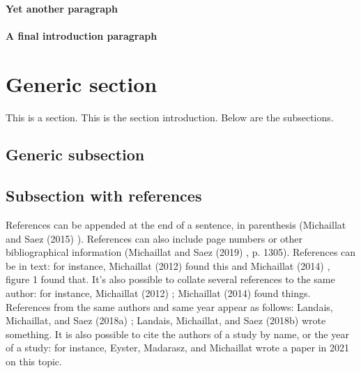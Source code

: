 \documentclass{article}
\begin{document}
\paragraph{Yet another paragraph} \wcTpLoremIpsum*[type=sentence,words-per-sentence=89,seed=108]{} 

\paragraph{A final introduction paragraph} \wcTpLoremIpsum*[type=sentence,words-per-sentence=134,seed=109]{} 

\section{Generic section}\label{s:section}

This is a section. This is the section introduction. Below are the subsections. \wcTpLoremIpsum*[type=sentence,words-per-sentence=31,seed=110]{}  

\subsection{Generic subsection}

 \wcTpLoremIpsum*[type=sentence,words-per-sentence=66,seed=111]{}  

 \wcTpLoremIpsum*[type=sentence,words-per-sentence=56,seed=112]{} \wcTpRef*[href=^note-4]{} 

 \wcTpLoremIpsum*[type=sentence,words-per-sentence=125,seed=113]{} 

\subsection{Subsection with references} 

References can be appended at the end of a sentence, in parenthesis (Michaillat and Saez (2015) \wcTpRef*[href=@MS15]{}). References can also include page numbers or other bibliographical information (Michaillat and Saez (2019) \wcTpRef*[href=@MS19]{}, p. 1305).  References can be in text: for instance, Michaillat (2012) \wcTpRef*[href=@M12]{} found this and Michaillat (2014) \wcTpRef*[href=@M14]{}, figure 1 found that. It's also possible to collate several references to the same author: for instance, Michaillat (2012) \wcTpRef*[href=@M12]{}; Michaillat (2014) \wcTpRef*[href=@M14]{} found things. References from the same authors and same year appear as follows: Landais, Michaillat, and Saez (2018a) \wcTpRef*[href=@LMS18a]{}; Landais, Michaillat, and Saez (2018b) \wcTpRef*[href=@LMS18b]{} wrote something. It is also possible to cite the authors of a study by name, or the year of a study: for instance, Eyster, Madarasz, and Michaillat \wcTpRef*[href=@EMM21]{} wrote a paper in 2021 \wcTpRef*[href=@EMM21]{} on this topic.
\end{document}

